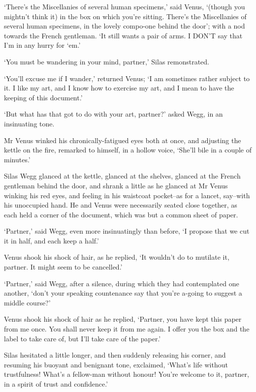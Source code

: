 ‘There’s the Miscellanies of several human specimens,’ said Venus,
‘(though you mightn’t think it) in the box on which you’re sitting.
There’s the Miscellanies of several human specimens, in the lovely
compo-one behind the door’; with a nod towards the French gentleman. ‘It
still wants a pair of arms. I DON’T say that I’m in any hurry for ‘em.’

‘You must be wandering in your mind, partner,’ Silas remonstrated.

‘You’ll excuse me if I wander,’ returned Venus; ‘I am sometimes rather
subject to it. I like my art, and I know how to exercise my art, and I
mean to have the keeping of this document.’

‘But what has that got to do with your art, partner?’ asked Wegg, in an
insinuating tone.

Mr Venus winked his chronically-fatigued eyes both at once, and
adjusting the kettle on the fire, remarked to himself, in a hollow
voice, ‘She’ll bile in a couple of minutes.’

Silas Wegg glanced at the kettle, glanced at the shelves, glanced at the
French gentleman behind the door, and shrank a little as he glanced at
Mr Venus winking his red eyes, and feeling in his waistcoat pocket--as
for a lancet, say--with his unoccupied hand. He and Venus were
necessarily seated close together, as each held a corner of the
document, which was but a common sheet of paper.

‘Partner,’ said Wegg, even more insinuatingly than before, ‘I propose
that we cut it in half, and each keep a half.’

Venus shook his shock of hair, as he replied, ‘It wouldn’t do to
mutilate it, partner. It might seem to be cancelled.’

‘Partner,’ said Wegg, after a silence, during which they had
contemplated one another, ‘don’t your speaking countenance say that
you’re a-going to suggest a middle course?’

Venus shook his shock of hair as he replied, ‘Partner, you have kept
this paper from me once. You shall never keep it from me again. I offer
you the box and the label to take care of, but I’ll take care of the
paper.’

Silas hesitated a little longer, and then suddenly releasing his corner,
and resuming his buoyant and benignant tone, exclaimed, ‘What’s life
without trustfulness! What’s a fellow-man without honour! You’re welcome
to it, partner, in a spirit of trust and confidence.’

